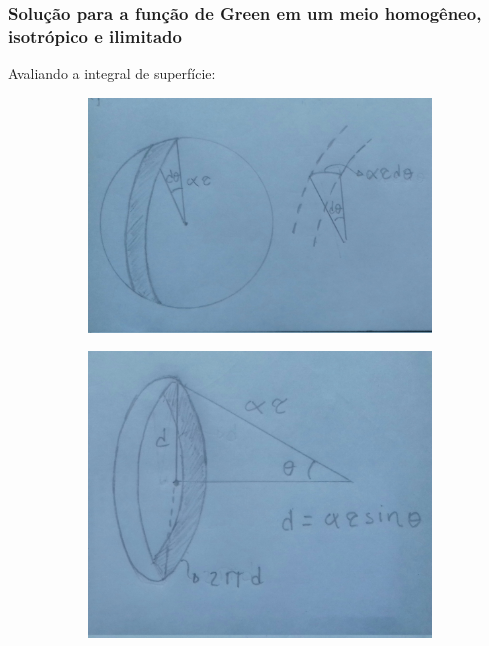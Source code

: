 \documentclass[xcolor=table]{beamer}
\begin{document}
\begin{frame}
\frametitle{\textbf{Solu\c{c}\~ao para a fun\c{c}\~ao de Green em um meio homog\^eneo, isotr\'opico e ilimitado}}
\begin{flushleft}
    \textcolor{red!60!black}{Avaliando a integral de superf\'icie:}
\end{flushleft}    

  \begin{figure}[h!]   
  \begin{subfigure}[t]{0.40\linewidth}
    \includegraphics[scale=0.060]{Figura/Fig3.jpg}\\        
  \end{subfigure}  
  \begin{subfigure}[t]{0.40\linewidth}
    \includegraphics[scale=0.0615]{Figura/Fig4.jpg}\\            

\end{subfigure}
\end{figure}
\end{frame}
\end{document}
